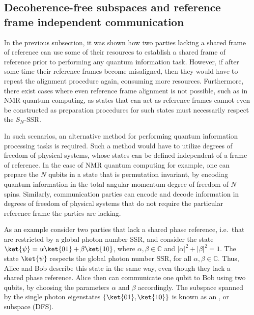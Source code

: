 \subsection{\label{DFS}Decoherence-free subspaces and reference frame independent communication}

In the previous subsection, it was shown how two parties lacking a shared frame of reference can use some of their resources to establish a shared frame of reference prior to performing any quantum information task.  However, if after some time their reference frames become misaligned, then they would have to repeat the alignment procedure again, consuming more resources.  Furthermore, there exist cases where even reference frame alignment is not possible, such as in NMR quantum computing, as states that can act as reference frames cannot even be constructed as preparation procedures for such states must necessarily respect the $S_N$-SSR.

In such scenarios, an alternative method for performing quantum information processing tasks is required.  Such a method would have to utilize degrees of freedom of physical systems, whose states can be defined independent of a frame of reference.  In the case of NMR quantum computing for example, one can prepare the $N$ qubits in a state that is permutation invariant, by encoding quantum information in the total angular momentum degree of freedom of $N$ spins.  Similarly, communication parties can encode and decode information in degrees of freedom of physical systems that do not require the particular reference frame the parties are lacking. 

As an example consider two parties that lack a shared phase reference, i.e.~that are restricted by a global photon number SSR, and consider the state $\ket{\psi}=\alpha\ket{01}+\beta\ket{10}$, where $\alpha,\beta\in\mathbb{C}$ and $|\alpha|^2+|\beta|^2=1$. The state $\ket{\psi}$ respects the global photon number SSR, for all $\alpha,\beta\in\mathbb{C}$.  Thus, Alice and Bob describe this state in the same way, even though they lack a shared phase reference.  Alice then can communicate one  qubit to Bob using two  qubits, by choosing the parameters $\alpha$ and $\beta$ accordingly.  The subspace spanned by the single photon eigenstates $\{\ket{01},\ket{10}\}$ is known as an , or  subspace (DFS). 


